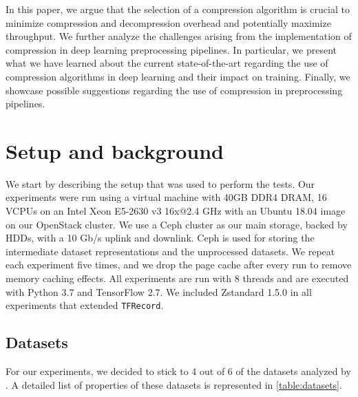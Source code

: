 \documentclass[sigconf,nonacm]{acmart}
\begin{document}
In this paper, we argue that the selection of a compression algorithm is crucial to minimize compression and decompression overhead and potentially maximize throughput.
We further analyze the challenges arising from the implementation of compression in deep learning preprocessing pipelines.
In particular, we present what we have learned about the current state-of-the-art regarding the use of compression algorithms in deep learning and their impact on training.
Finally, we showcase possible suggestions regarding the use of compression in preprocessing pipelines.

\section{Setup and background}
We start by describing the setup that was used to perform the tests.
Our experiments were run using a virtual machine with 40GB DDR4 DRAM, 16 VCPUs on an Intel Xeon E5-2630 v3 16x@2.4 GHz with an Ubuntu 18.04 image on our OpenStack cluster.
We use a Ceph cluster as our main storage, backed by HDDs, with a 10 Gb/s uplink and downlink.
Ceph is used for storing the intermediate dataset representations and the unprocessed datasets.
We repeat each experiment five times, and we drop the page cache after every run to remove memory caching effects.
All experiments are run with 8 threads and are executed with Python 3.7 and TensorFlow 2.7.
We included Zstandard 1.5.0 in all experiments that extended \texttt{TFRecord}.

\subsection{Datasets}
For our experiments, we decided to stick to 4 out of 6 of the datasets analyzed by \citet{isenko2022bottleneck}.
A detailed list of properties of these datasets is represented in \autoref{table:datasets}.
\end{document}
